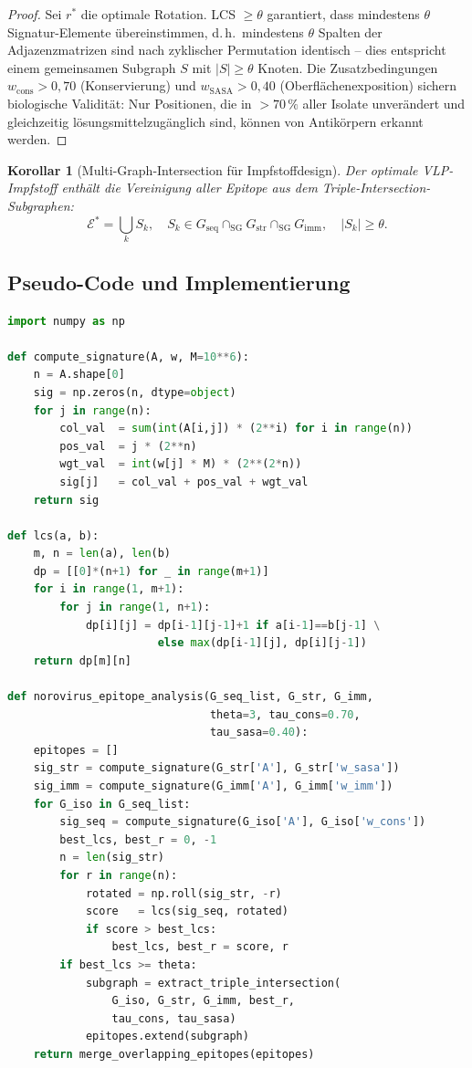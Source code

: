 ﻿\documentclass[a4paper,12pt]{article}
\theoremstyle{plain}
\newtheorem{korollar}[satz]{Korollar}
\theoremstyle{definition}
\theoremstyle{remark}
\begin{document}
\begin{proof}
Sei $r^*$ die optimale Rotation. LCS $\geq \theta$ garantiert, dass mindestens $\theta$
Signatur-Elemente übereinstimmen, d.\,h.\ mindestens $\theta$ Spalten der Adjazenzmatrizen
sind nach zyklischer Permutation identisch -- dies entspricht einem gemeinsamen Subgraph
$S$ mit $|S| \geq \theta$ Knoten. Die Zusatzbedingungen $w_{\text{cons}}>0{,}70$
(Konservierung) und $w_{\text{SASA}}>0{,}40$ (Oberflächenexposition) sichern
biologische Validität: Nur Positionen, die in $>70\,\%$ aller Isolate unverändert
und gleichzeitig lösungsmittelzugänglich sind, können von Antikörpern erkannt werden.
\end{proof}

\begin{korollar}[Multi-Graph-Intersection für Impfstoffdesign]\label{kor:multi}
Der optimale VLP-Impfstoff enthält die Vereinigung aller Epitope aus dem
\emph{Triple-Intersection-Subgraphen}:
\[
  \mathcal{E}^* = \bigcup_{k} S_k,\quad
  S_k \in G_{\text{seq}} \cap_{\mathrm{SG}} G_{\text{str}} \cap_{\mathrm{SG}} G_{\text{imm}},
  \quad |S_k|\geq\theta.
\]
\end{korollar}

\subsection{Pseudo-Code und Implementierung}

\begin{lstlisting}[language=Python,
  caption={Subgraph-Analyse für Norovirus-Epitop-Identifikation},
  label=lst:subgraph]
import numpy as np

def compute_signature(A, w, M=10**6):
    n = A.shape[0]
    sig = np.zeros(n, dtype=object)
    for j in range(n):
        col_val  = sum(int(A[i,j]) * (2**i) for i in range(n))
        pos_val  = j * (2**n)
        wgt_val  = int(w[j] * M) * (2**(2*n))
        sig[j]   = col_val + pos_val + wgt_val
    return sig

def lcs(a, b):
    m, n = len(a), len(b)
    dp = [[0]*(n+1) for _ in range(m+1)]
    for i in range(1, m+1):
        for j in range(1, n+1):
            dp[i][j] = dp[i-1][j-1]+1 if a[i-1]==b[j-1] \
                       else max(dp[i-1][j], dp[i][j-1])
    return dp[m][n]

def norovirus_epitope_analysis(G_seq_list, G_str, G_imm,
                               theta=3, tau_cons=0.70,
                               tau_sasa=0.40):
    epitopes = []
    sig_str = compute_signature(G_str['A'], G_str['w_sasa'])
    sig_imm = compute_signature(G_imm['A'], G_imm['w_imm'])
    for G_iso in G_seq_list:
        sig_seq = compute_signature(G_iso['A'], G_iso['w_cons'])
        best_lcs, best_r = 0, -1
        n = len(sig_str)
        for r in range(n):
            rotated = np.roll(sig_str, -r)
            score   = lcs(sig_seq, rotated)
            if score > best_lcs:
                best_lcs, best_r = score, r
        if best_lcs >= theta:
            subgraph = extract_triple_intersection(
                G_iso, G_str, G_imm, best_r,
                tau_cons, tau_sasa)
            epitopes.extend(subgraph)
    return merge_overlapping_epitopes(epitopes)
\end{lstlisting}
\end{document}
